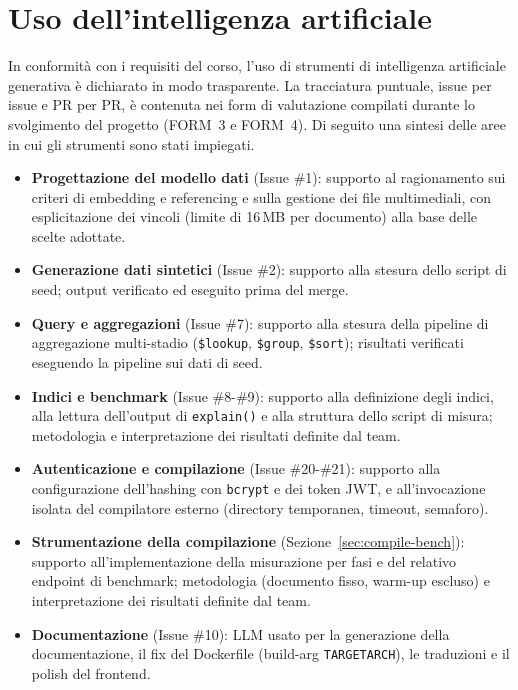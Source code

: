 \documentclass[11pt,a4paper]{article}
\begin{document}
\section{Uso dell'intelligenza artificiale}

In conformità con i requisiti del corso, l'uso di strumenti di intelligenza artificiale generativa è dichiarato in modo trasparente. La tracciatura puntuale, issue per issue e PR per PR, è contenuta nei form di valutazione compilati durante lo svolgimento del progetto (FORM~3 e FORM~4). Di seguito una sintesi delle aree in cui gli strumenti sono stati impiegati.

\begin{itemize}[leftmargin=2.2em]
  \item \textbf{Progettazione del modello dati} (Issue \#1): supporto al ragionamento sui criteri di embedding e referencing e sulla gestione dei file multimediali, con esplicitazione dei vincoli (limite di 16\,MB per documento) alla base delle scelte adottate.
  \item \textbf{Generazione dati sintetici} (Issue \#2): supporto alla stesura dello script di seed; output verificato ed eseguito prima del merge.
  \item \textbf{Query e aggregazioni} (Issue \#7): supporto alla stesura della pipeline di aggregazione multi-stadio (\texttt{\$lookup}, \texttt{\$group}, \texttt{\$sort}); risultati verificati eseguendo la pipeline sui dati di seed.
  \item \textbf{Indici e benchmark} (Issue \#8-\#9): supporto alla definizione degli indici, alla lettura dell'output di \texttt{explain()} e alla struttura dello script di misura; metodologia e interpretazione dei risultati definite dal team.
  \item \textbf{Autenticazione e compilazione} (Issue \#20-\#21): supporto alla configurazione dell'hashing con \texttt{bcrypt} e dei token JWT, e all'invocazione isolata del compilatore esterno (directory temporanea, timeout, semaforo).
  \item \textbf{Strumentazione della compilazione} (Sezione~\ref{sec:compile-bench}): supporto all'implementazione della misurazione per fasi e del relativo endpoint di benchmark; metodologia (documento fisso, warm-up escluso) e interpretazione dei risultati definite dal team.
  \item \textbf{Documentazione} (Issue \#10): LLM usato per la generazione della documentazione, il fix del Dockerfile (build-arg \texttt{TARGETARCH}), le traduzioni e il polish del frontend.
\end{itemize}
\end{document}
